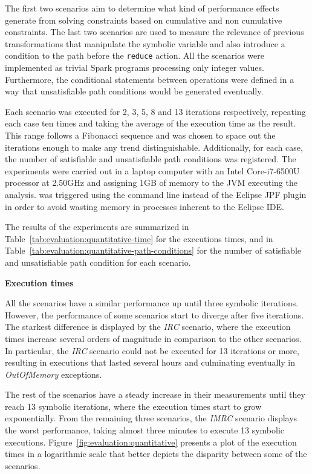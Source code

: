 The first two scenarios aim to determine what kind of performance effects generate from solving constraints based on cumulative and non cumulative constraints. The last two scenarios are used to measure the relevance of previous transformations that manipulate the symbolic variable and also introduce a condition to the path before the \texttt{reduce} action. All the scenarios were implemented as trivial Spark programs processing only integer values. Furthermore, the conditional statements between operations were defined in a way that unsatisfiable path conditions would be generated eventually.

Each scenario was executed for 2, 3, 5, 8 and 13 iterations respectively, repeating each case ten times and taking the average of the execution time as the result. This range follows a Fibonacci sequence and was chosen to space out the iterations enough to make any trend distinguishable. Additionally, for each case, the number of satisfiable and unsatisfiable path conditions was registered. The experiments were carried out in a laptop computer with an Intel Core-i7-6500U processor at 2.50GHz and assigning 1GB of memory to the JVM executing the analysis. \jpf{} was triggered using the command line instead of the Eclipse JPF plugin in order to avoid wasting memory in processes inherent to the Eclipse IDE.


The results of the experiments are summarized in Table~\ref{tab:evaluation:quantitative-time} for the executions times, and in Table~\ref{tab:evaluation:quantitative-path-conditions} for the number of satisfiable and unsatisfiable path condition for each scenario.

\textbf{Execution times}

All the scenarios have a similar performance up until three symbolic iterations. However, the performance of some scenarios start to diverge after five iterations. The starkest difference is displayed by the \textit{IRC} scenario, where the execution times increase several orders of magnitude in comparison to the other scenarios. In particular, the \textit{IRC} scenario could not be executed for 13 iterations or more, resulting in executions that lasted several hours and culminating eventually in \textit{OutOfMemory} exceptions.

The rest of the scenarios have a steady increase in their measurements until they reach 13 symbolic iterations, where the execution times start to grow exponentially. From the remaining three scenarios, the \textit{IMRC} scenario displays the worst performance, taking almost three minutes to execute 13 symbolic executions. Figure~\ref{fig:evaluation:quantitative} presents a plot of the execution times in a logarithmic scale that better depicts the disparity between some of the scenarios.

